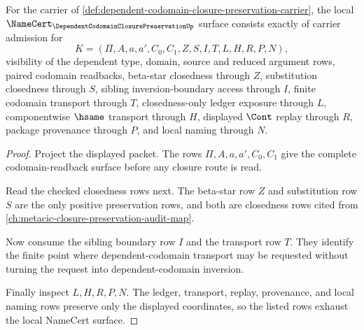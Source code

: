 \begin{theorem}
\label{thm:dependent-codomain-closure-preservation-obligations}
For the carrier of \autoref{def:dependent-codomain-closure-preservation-carrier}, the local $\NameCert_{\DependentCodomainClosurePreservationUp}$ surface consists exactly of carrier admission for
$$
K=(\Pi,A,a,a',C_0,C_1,Z,S,I,T,L,H,R,P,N),
$$
visibility of the dependent type, domain, source and reduced argument rows, paired codomain readbacks, beta-star closedness through $Z$, substitution closedness through $S$, sibling inversion-boundary access through $I$, finite codomain transport through $T$, closedness-only ledger exposure through $L$, componentwise $\hsame$ transport through $H$, displayed $\Cont$ replay through $R$, package provenance through $P$, and local naming through $N$.
\end{theorem}
\begin{proof}
Project the displayed packet. The rows $\Pi,A,a,a',C_0,C_1$ give the complete codomain-readback surface before any closure route is read.

Read the checked closedness rows next. The beta-star row $Z$ and substitution row $S$ are the only positive preservation rows, and both are closedness rows cited from \autoref{ch:metacic-closure-preservation-audit-map}.

Now consume the sibling boundary row $I$ and the transport row $T$. They identify the finite point where dependent-codomain transport may be requested without turning the request into dependent-codomain inversion.

Finally inspect $L,H,R,P,N$. The ledger, transport, replay, provenance, and local naming rows preserve only the displayed coordinates, so the listed rows exhaust the local NameCert surface.
\end{proof}

